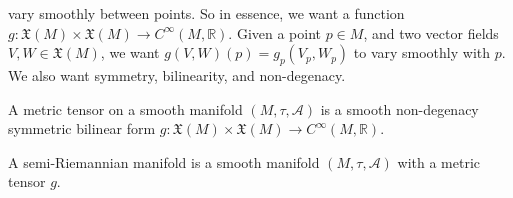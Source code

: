 \documentclass{article}                                                        %
\begin{document}
        vary smoothly between points. So in essence, we want a function
        $g:\mathfrak{X}(M)\times\mathfrak{X}(M)%
         \rightarrow{C}^{\infty}(M,\mathbb{R})$. Given a point $p\in{M}$,
        and two vector fields $V,W\in\mathfrak{X}(M)$, we want
        $g(V,W)(p)=g_{p}(V_{p},W_{p})$ to vary smoothly with $p$. We also want
        symmetry, bilinearity, and non-degenacy.
        \begin{definition}
            A metric tensor on a smooth manifold $(M,\tau,\mathcal{A})$ is a
            smooth non-degenacy symmetric bilinear form
            $g:\mathfrak{X}(M)\times\mathfrak{X}(M)%
             \rightarrow{C}^{\infty}(M,\mathbb{R})$.
        \end{definition}
        \begin{definition}
            A semi-Riemannian manifold is a smooth manifold
            $(M,\tau,\mathcal{A})$ with a metric tensor $g$.
        \end{definition}
\end{document}
